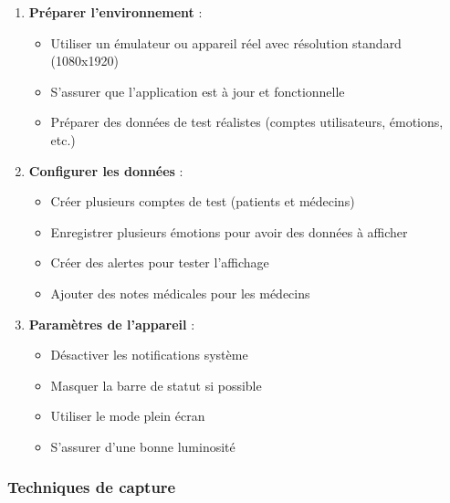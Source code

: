 \documentclass[a4paper,11pt]{report}
\begin{document}
\begin{enumerate}
    \item \textbf{Préparer l'environnement} :
    \begin{itemize}
        \item Utiliser un émulateur ou appareil réel avec résolution standard (1080x1920)
        \item S'assurer que l'application est à jour et fonctionnelle
        \item Préparer des données de test réalistes (comptes utilisateurs, émotions, etc.)
    \end{itemize}
    
    \item \textbf{Configurer les données} :
    \begin{itemize}
        \item Créer plusieurs comptes de test (patients et médecins)
        \item Enregistrer plusieurs émotions pour avoir des données à afficher
        \item Créer des alertes pour tester l'affichage
        \item Ajouter des notes médicales pour les médecins
    \end{itemize}
    
    \item \textbf{Paramètres de l'appareil} :
    \begin{itemize}
        \item Désactiver les notifications système
        \item Masquer la barre de statut si possible
        \item Utiliser le mode plein écran
        \item S'assurer d'une bonne luminosité
    \end{itemize}
\end{enumerate}

\subsubsection{Techniques de capture}
\end{document}
